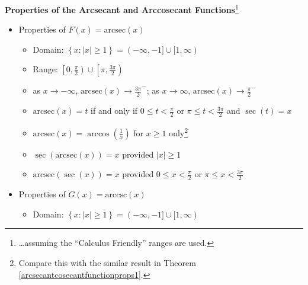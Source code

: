 \documentclass[12pt]{ximera}
\begin{document}
\begin{theorem} \label{arcsecantcosecantfunctionprops2}  \textbf{Properties of the Arcsecant and Arccosecant Functions}\footnote{\ldots assuming the ``Calculus Friendly'' ranges are used.}  

\begin{itemize}

\item Properties of $F(x)= \mbox{arcsec}(x)$  

\begin{itemize}

\item Domain: $\left\{ x : |x| \geq 1 \right\} = (-\infty, -1] \cup [1,\infty)$

\item Range: $\left[0, \frac{\pi}{2} \right) \cup \left[\pi, \frac{3\pi}{2} \right)$

\item  as $x \rightarrow -\infty$, $\mbox{arcsec}(x) \rightarrow \frac{3\pi}{2}^{-}$;  as $x \rightarrow \infty$, $\mbox{arcsec}(x) \rightarrow \frac{\pi}{2}^{-}$

\item  $\mbox{arcsec}(x) = t$ if and only if $0 \leq t < \frac{\pi}{2}$ or $ \pi \leq  t < \frac{3\pi}{2}$ and $\sec(t) = x$

\item  $\mbox{arcsec}(x) = \arccos\left(\frac{1}{x}\right)$ for $x \geq 1$ only\footnote{Compare this with the similar result in Theorem \ref{arcsecantcosecantfunctionprops1}.}

\item  $\sec\left(\mbox{arcsec}(x)\right) = x$ provided $|x| \geq 1$

\item  $\mbox{arcsec}(\sec(x)) = x$ provided $0 \leq x < \frac{\pi}{2}$ or $ \pi \leq  x < \frac{3\pi}{2}$


\end{itemize}

\item Properties of $G(x) = \mbox{arccsc}(x)$  

\begin{itemize}

\item Domain: $\left\{ x : |x| \geq 1 \right\} = (-\infty, -1] \cup [1,\infty)$


\end{itemize}
\end{itemize}
\end{theorem}
\end{document}
